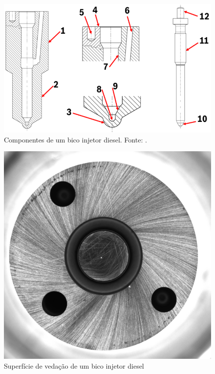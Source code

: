 \documentclass[conference]{IEEEtran}
\begin{document}
\begin{figure}[t]
	\centering
	\includegraphics[scale=0.35]{Images/bico-injetor.png}
	\caption{Componentes de um bico injetor diesel. Fonte: \cite{Girotto2023}.}
	\label{fig:bico-injetor}
\end{figure}

\begin{figure}[t]
	\centering
	\includegraphics[scale=0.11]{Images/superficie-de-vedacao.jpg}
	\caption{Superfície de vedação de um bico injetor diesel}
	\label{fig:superficie-de-vedacao}
\end{figure}
\end{document}
